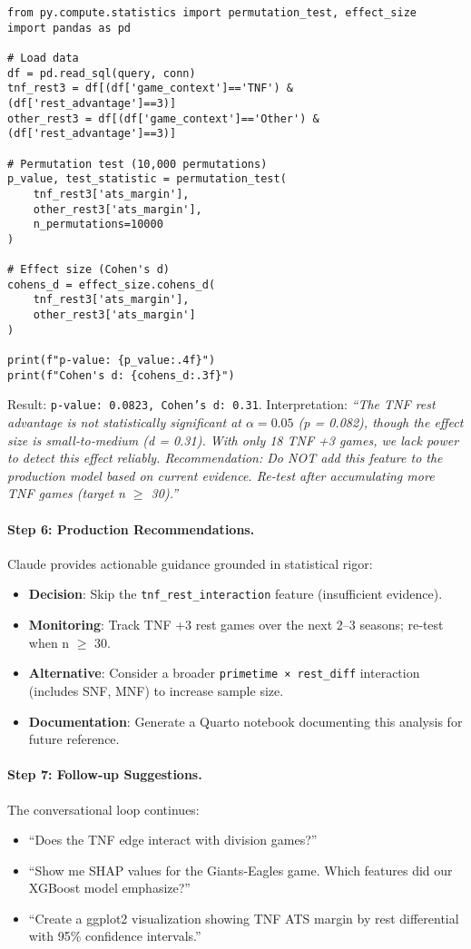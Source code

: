 \begin{verbatim}
from py.compute.statistics import permutation_test, effect_size
import pandas as pd

# Load data
df = pd.read_sql(query, conn)
tnf_rest3 = df[(df['game_context']=='TNF') & (df['rest_advantage']==3)]
other_rest3 = df[(df['game_context']=='Other') & (df['rest_advantage']==3)]

# Permutation test (10,000 permutations)
p_value, test_statistic = permutation_test(
    tnf_rest3['ats_margin'],
    other_rest3['ats_margin'],
    n_permutations=10000
)

# Effect size (Cohen's d)
cohens_d = effect_size.cohens_d(
    tnf_rest3['ats_margin'],
    other_rest3['ats_margin']
)

print(f"p-value: {p_value:.4f}")
print(f"Cohen's d: {cohens_d:.3f}")
\end{verbatim}

Result: \texttt{p-value: 0.0823, Cohen's d: 0.31}. Interpretation: \textit{``The TNF rest advantage is not statistically significant at $\alpha = 0.05$ (p = 0.082), though the effect size is small‑to‑medium (d = 0.31). With only 18 TNF +3 games, we lack power to detect this effect reliably. Recommendation: Do NOT add this feature to the production model based on current evidence. Re‑test after accumulating more TNF games (target n $\geq$ 30).''}

\paragraph{Step 6: Production Recommendations.}
Claude provides actionable guidance grounded in statistical rigor:
\begin{itemize}
\item \textbf{Decision}: Skip the \texttt{tnf\_rest\_interaction} feature (insufficient evidence).
\item \textbf{Monitoring}: Track TNF +3 rest games over the next 2--3 seasons; re‑test when n $\geq$ 30.
\item \textbf{Alternative}: Consider a broader \texttt{primetime × rest\_diff} interaction (includes SNF, MNF) to increase sample size.
\item \textbf{Documentation}: Generate a Quarto notebook documenting this analysis for future reference.
\end{itemize}

\paragraph{Step 7: Follow‑up Suggestions.}
The conversational loop continues:
\begin{itemize}
\item ``Does the TNF edge interact with division games?''
\item ``Show me SHAP values for the Giants‑Eagles game. Which features did our XGBoost model emphasize?''
\item ``Create a ggplot2 visualization showing TNF ATS margin by rest differential with 95\% confidence intervals.''
\end{itemize}

